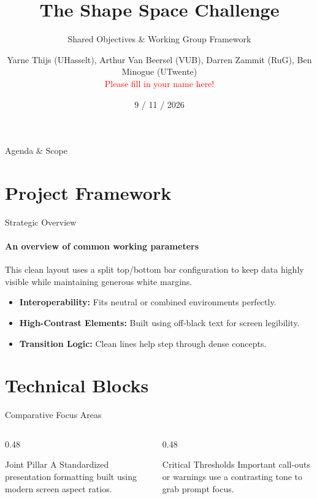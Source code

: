 \documentclass[11pt, aspectratio=169]{beamer}
\title[Shape Space]{The Shape Space Challenge}
\subtitle{Shared Objectives \& Working Group Framework}
\author[Yarne, Arthur, Darren, Ben]{Yarne Thijs (UHasselt), Arthur Van Beersel (VUB), Darren Zammit (RuG), Ben Minogue (UTwente) \\\textcolor{red}{Please fill in your name here!}}
\institute[Noesis]{Noesis}
\date[9 / 11 / 2026]{9 / 11 / 2026}
\begin{document}
{ %
\begin{frame}
    \titlepage
\end{frame}
}

\begin{frame}{Agenda \& Scope}
    \tableofcontents
\end{frame}

\section{Project Framework}
\begin{frame}{Strategic Overview}
    \framesubtitle{An overview of common working parameters}
    
    This clean layout uses a split top/bottom bar configuration to keep data highly visible while maintaining generous white margins.
    
    \begin{itemize}
        \item \textbf{Interoperability:} Fits neutral or combined environments perfectly.
        \item \textbf{High-Contrast Elements:} Built using off-black text for screen legibility.
        \item \textbf{Transition Logic:} Clean lines help step through dense concepts.
    \end{itemize}
\end{frame}

\section{Technical Blocks}
\begin{frame}{Comparative Focus Areas}
    \begin{columns}[T]
        
        \begin{column}{0.48\textwidth}
            \begin{block}{Joint Pillar A}
                Standardized presentation formatting built using modern screen aspect ratios.
            \end{block}
        \end{column}
        
        \begin{column}{0.48\textwidth}
            \begin{alertblock}{Critical Thresholds}
                Important call-outs or warnings use a contrasting tone to grab prompt focus.
            \end{alertblock}
        \end{column}
        
    \end{columns}
\end{frame}
\end{document}

